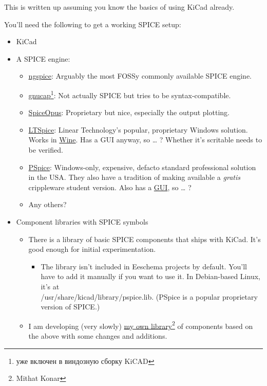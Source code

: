 

This is written up assuming you know the basics of using KiCad already.

\secdown


You'll need the following to get a working SPICE setup:

\begin{itemize}
\item KiCad
\item A SPICE engine:
\begin{itemize}
\item \href{http://ngspice.sourceforge.net/}{ngspice}: Arguably the most FOSSy
commonly available SPICE engine.
\item
\href{https://www.gnu.org/software/gnucap/}{gnucap}\footnote{уже включен в
виндозную сборку KiCAD}:
Not actually SPICE but tries to be syntax-compatible.
\item \href{http://www.spiceopus.si/}{SpiceOpus}: Proprietary but nice,
especially the output plotting.
\item \href{http://www.linear.com/designtools/software/}{LTSpice}: Linear
Technology's popular, proprietary Windows solution.
Works in \href{http://www.winehq.org/}{Wine}. Has a GUI anyway, so … ? Whether
it's scritable needs to be verified.
\item
\href{http://www.cadence.com/products/orcad/pspice_simulation/Pages/default.aspx}{PSpice}:
Windows-only, expensive, defacto standard professional solution in the USA. They
also have a tradition of making available a \emph{gratis} crippleware student
version.
Also has a \underline{GUI}, so … ?
\item Any others?
\end{itemize}
\item Component libraries with SPICE symbols
\begin{itemize}
  
\item There is a library of basic SPICE components that ships with KiCad. It's
good enough for initial experimentation.

\begin{itemize}
\item The library isn't included in Eeschema projects by default. You'll have to
add it manually if you want to use it.
In Debian-based Linux, it's at \\/usr/share/kicad/library/pspice.lib. (PSpice is
a popular proprietary version of SPICE.)
\end{itemize} 

\item I am developing (very slowly)
\href{https://bitbucket.org/mithat/kicad-spice-library}{my own 
library}\footnote{Mithat Konar }
of components based on the above with some changes and additions.
 
\end{itemize} 

\end{itemize}

